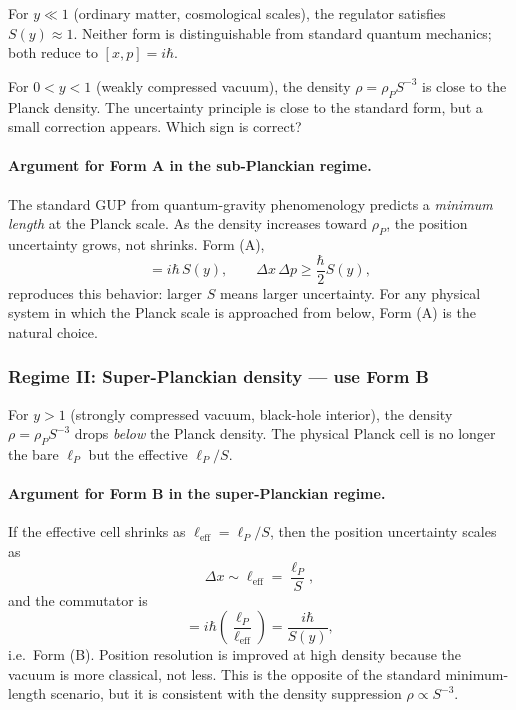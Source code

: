 \documentclass[a4paper,7pt,oneside,openany]{book}
\begin{document}
For $y\ll 1$ (ordinary matter, cosmological scales), the 
regulator satisfies $S(y)\approx 1$. Neither form is 
distinguishable from standard quantum mechanics; both reduce to 
$[x,p]=i\hbar$.

For $0<y<1$ (weakly compressed vacuum), the density 
$\rho=\rho_{P}S^{-3}$ is close to the Planck density. The 
uncertainty principle is close to the standard form, but a 
small correction appears. Which sign is correct?

\paragraph{Argument for Form A in the sub-Planckian regime.}
The standard GUP from quantum-gravity phenomenology predicts a 
\emph{minimum length} at the Planck scale. As the density 
increases toward $\rho_{P}$, the position uncertainty grows, not 
shrinks. Form (A),
\begin{equation}
[x,p]=i\hbar\,S(y),
\qquad
\Delta x\,\Delta p\geq\frac{\hbar}{2}S(y),
\label{eq:FormA-sub}
\end{equation}
reproduces this behavior: larger $S$ means larger uncertainty. 
For any physical system in which the Planck scale is 
approached from below, Form (A) is the natural choice.

\subsubsection{Regime II: Super-Planckian density --- use Form B}

For $y>1$ (strongly compressed vacuum, black-hole interior), 
the density $\rho=\rho_{P}S^{-3}$ drops \emph{below} the Planck 
density. The physical Planck cell is no longer the bare 
$\ell_{P}$ but the effective $\ell_{P}/S$. 

\paragraph{Argument for Form B in the super-Planckian regime.}
If the effective cell shrinks as $\ell_{\text{eff}}=\ell_{P}/S$, 
then the position uncertainty scales as
\begin{equation}
\Delta x\sim\ell_{\text{eff}}=\frac{\ell_{P}}{S},
\label{eq:Dx-B}
\end{equation}
and the commutator is
\begin{equation}
[x,p]=i\hbar\left(\frac{\ell_{P}}{\ell_{\text{eff}}}\right)
=\frac{i\hbar}{S(y)},
\label{eq:FormB-super}
\end{equation}
i.e.\ Form (B). Position resolution is improved at high density 
because the vacuum is more classical, not less. This is the 
opposite of the standard minimum-length scenario, but it is 
consistent with the density suppression $\rho\propto S^{-3}$.
\end{document}
